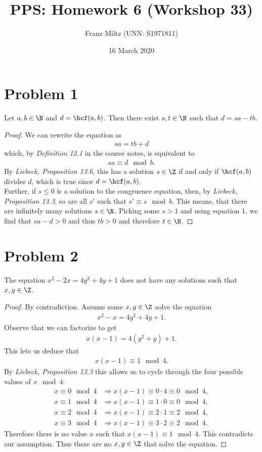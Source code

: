 \documentclass{article}
\title{PPS: Homework 6 (Workshop 33)}
\author{Franz Miltz (UNN: S1971811)}
\date{16 March 2020}
\begin{document}
\maketitle
\section*{Problem 1}
\begin{claim}
  Let $a,b\in\N$ and $d=\hcf(a,b)$. Then there exist $s,t\in\N$ such that $d=sa-tb$.
\end{claim}
\begin{proof}
  We can rewrite the equation as
  \begin{align}
    \label{eq:1}
    sa = tb + d
  \end{align}
  which, by \emph{Definition 12.1} in the course notes, is equivalent to
  \begin{align*}
    sa \equiv d \mod b.
  \end{align*}
  By \emph{Liebeck, Proposition 13.6}, this has a solution $s\in\Z$ if and only if $\hcf(a,b)$ divides $d$, which is true since $d=\hcf(a,b)$.\\
  Further, if $s\leq 0$ is a solution to the congruence equation, then, by \emph{Liebeck, Proposition 13.3}, so are all $s'$ such that $s' \equiv s \mod b$.
  This means, that there are infinitely many solutions $s\in\N$.
  Picking some $s>1$ and using equation $1$, we find that $sa-d>0$ and thus $tb>0$ and therefore $t\in\N$.
\end{proof}
\section*{Problem 2}
\begin{claim}
  The equation $x^2-2x=4y^2+4y+1$ does not have any solutions such that $x,y\in\Z$.
\end{claim}
\begin{proof}
  By contradiction. Assume some $x,y\in\Z$ solve the equation
  \begin{align*}
    x^2-x=4y^2+4y+1.
  \end{align*}
  Observe that we can factorize to get
  \begin{align*}
    x(x-1)=4(y^2+y)+1.
  \end{align*}
  This lets us deduce that
  \begin{align*}
    x(x-1) \equiv 1 \mod 4.
  \end{align*}
  By \emph{Liebeck, Proposition 13.3} this allows us to cycle through the four possible values of $x\mod 4$:
  \begin{align*}
    x\equiv 0 \mod 4 &\Rightarrow x(x-1) \equiv 0\cdot 4 \equiv 0 \mod 4,\\
    x\equiv 1 \mod 4 &\Rightarrow x(x-1) \equiv 1\cdot 0 \equiv 0 \mod 4,\\
    x\equiv 2 \mod 4 &\Rightarrow x(x-1) \equiv 2\cdot 1 \equiv 2 \mod 4,\\
    x\equiv 3 \mod 4 &\Rightarrow x(x-1) \equiv 3\cdot 2 \equiv 2 \mod 4.
  \end{align*}
  Therefore there is no value $x$ such that $x(x-1)\equiv 1 \mod 4$.
  This contradicts our assumption.
  Thus there are no $x,y\in\Z$ that solve the equation.
\end{proof}
\end{document}
